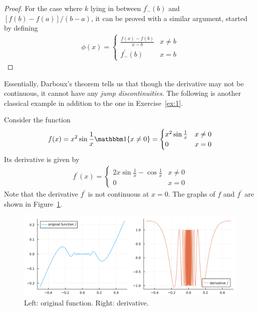 \documentclass[thmcnt=section, 12pt]{my-elegantbook}
\begin{document}
\begin{proof}
    \par For the case where $k$ lying in between $f^\prime_{-}(b)$ and $[f(b) - f(a)] / (b-a)$, it can be proved with a similar argument, started by defining
    \begin{align*}
        \phi(x) = \begin{cases}
            \frac{f(x) - f(b)}{x - b}
            &x \neq b \\ 
            f^\prime_{-}(b)
            &x = b
        \end{cases}
    \end{align*}
\end{proof}

\par Essentially, Darboux's theorem tells us that though the derivative may not be continuous, it cannot have any \textit{jump discontinuities}. The following is another classical example in addition to the one in Exercise~\ref{ex:1}.

\begin{example}
    Consider the function 
    \begin{align*}
        f(x) = x^2 \sin\frac{1}{x} \ind\{x \neq 0\}
        = \begin{cases}
            x^2 \sin\frac{1}{x}
            &x \neq 0 \\ 
            0 & x = 0
        \end{cases}
    \end{align*}
    Its derivative is given by 
    \begin{align*}
        f^\prime(x)
        = \begin{cases}
            2x \sin\frac{1}{x} - \cos\frac{1}{x}
            &x \neq 0 \\ 
            0 & x = 0
        \end{cases}
    \end{align*}
    Note that the derivative $f^\prime$ is not continuous at $x = 0$. The graphs of $f$ and $f^\prime$ are shown in Figure~\ref{fig:6}.
    \begin{figure}[ht]
        \centering
        \includegraphics[scale=0.2]{figures/graph-007.png}
        \caption{Left: original function. Right: derivative.}
        \label{fig:6}
    \end{figure}
\end{example}
\end{document}
